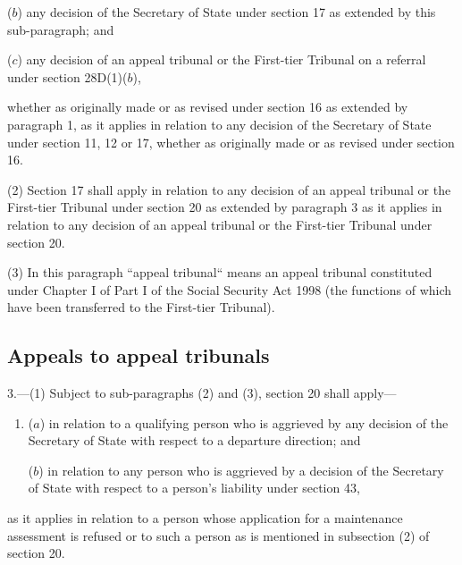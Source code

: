 \documentclass[12pt,a4paper]{article}
\begin{document}
{\begin{enumerate}
($b$) any decision of the Secretary of State under section 17 as extended by this sub-paragraph; and

($c$) any decision of 
an appeal tribunal or  %
the First-tier Tribunal on a referral under section 28D(1)($b$),
\end{enumerate}
whether as originally made or as revised under section 16 as extended by paragraph 1, as it applies in relation to any decision of the Secretary of State under section 11, 12 or 17, whether as originally made or as revised under section 16.

(2) Section 17 shall apply in relation to any decision of 
an appeal tribunal or  %
the First-tier Tribunal under section 20 as extended by paragraph 3 as it applies in relation to any decision of
an appeal tribunal or  %
the First-tier Tribunal under section 20.

(3) In this paragraph “appeal tribunal“ means an appeal tribunal constituted under Chapter I of Part I of the Social Security Act 1998 (the functions of which have been transferred to the First-tier Tribunal).


\subsection*{Appeals to appeal tribunals}

3.---(1) Subject to sub-paragraphs (2) and (3), section 20 shall apply---
\begin{enumerate}\item[]
($a$) in relation to a qualifying person who is aggrieved by any decision of the Secretary of State with respect to a departure direction; and

($b$) in relation to any person who is aggrieved by a decision of the Secretary of State%
%
{} with respect to a person’s liability under section 43,
\end{enumerate}
as it applies in relation to a person whose application for a maintenance assessment is refused or to such a person as is mentioned in subsection (2) of section 20.

}
\end{document}
